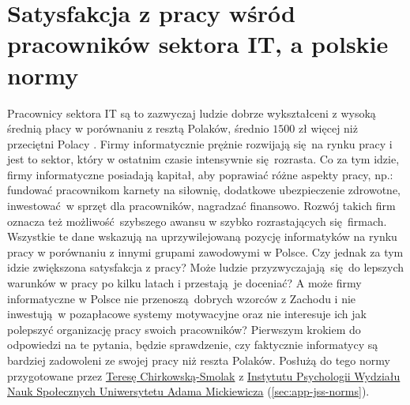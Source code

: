 \section{Satysfakcja z pracy wśród pracowników sektora IT, a polskie normy}
\label{sec:hip-sat-norms}
Pracownicy sektora IT są to zazwyczaj ludzie dobrze wykształceni z wysoką średnią płacy w porównaniu z resztą Polaków, średnio $1500$ zł więcej niż przeciętni Polacy \cite{web:earnings-it,web:earnings-pl}. Firmy informatycznie prężnie rozwijają się na rynku pracy i jest to sektor, który w ostatnim czasie intensywnie się rozrasta. Co za tym idzie, firmy informatyczne posiadają kapitał, aby poprawiać różne aspekty pracy, np.: fundować pracownikom karnety na siłownię, dodatkowe ubezpieczenie zdrowotne, inwestować w sprzęt dla pracowników, nagradzać
finansowo. Rozwój takich firm oznacza też możliwość szybszego awansu w szybko rozrastających się firmach. Wszystkie te dane wskazują na uprzywilejowaną pozycję informatyków na rynku pracy w porównaniu z innymi grupami zawodowymi w Polsce. Czy jednak za tym idzie zwiększona satysfakcja z pracy? Może ludzie przyzwyczajają się do lepszych warunków w pracy po kilku latach i przestają je doceniać? A może firmy informatyczne w Polsce nie
przenoszą dobrych wzorców z Zachodu i nie inwestują w pozapłacowe systemy motywacyjne oraz nie interesuje ich jak polepszyć organizację pracy swoich pracowników? Pierwszym krokiem do odpowiedzi na te pytania, będzie sprawdzenie, czy faktycznie informatycy są bardziej zadowoleni ze swojej pracy niż reszta Polaków. Posłużą do tego normy przygotowane przez
\href{http://www.psychologia.amu.edu.pl/ip-uam/struktura-zatrudnienia-w-instytucie/curriculum-vitae-teresa-chirkowska-smolak/}{Teresę Chirkowską-Smolak} z \href{http://www.psychologia.amu.edu.pl/}{Instytutu Psychologii Wydziału Nauk Społecznych Uniwersytetu Adama Mickiewicza} (\ref{sec:app-jss-norms}).

